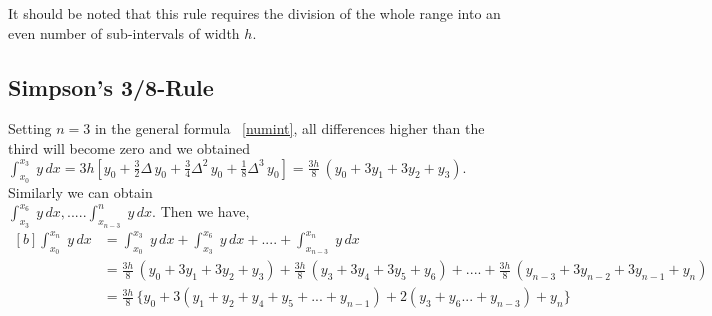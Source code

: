 \documentclass[aima203_lecturenotes_ku.tex]{subfiles}
\begin{document}
\begin{remark}
  It should be noted that this rule requires the division of the whole range into an even number of sub-intervals of width $h$.
\end{remark}

\subsection{Simpson's 3/8-Rule}
Setting $n=3$ in the general formula ~\ref{numint}, all differences higher than the third will become zero and we obtained \\[1mm]
$\displaystyle \int_{x_0}^{x_3} \; y\,dx = 3h \left [ y_0 + \frac{3}{2} \Delta \, y_0 + \frac{3}{4} \Delta^2 \, y_0 + \frac{1}{8} \Delta ^3 \, y_0 \right ] = \frac{3h}{8}\, (y_0 + 3y_1 + 3y_2+y_3).$ \\ Similarly we can obtain \\[5mm] $\int_{x_3}^{x_6} \; y\,dx, ..... \int_{x_{n-3}}^n \; y\,dx $. Then we have,
\begin{equation}
  \label{simp2}
  \begin{aligned}[b]
    \int_{x_0}^{x_n}\; y\,dx &= \int_{x_0}^{x_3} \; y\,dx + \int_{x_3}^{x_6} \; y\,dx + .... + \int_{x_{n-3}}^{x_n} \; y\,dx \\[1mm]
                             &= \frac{3h}{8} \, (y_0 +3y_1 + 3y_2 + y_3) + \frac{3h}{8} \, (y_3 + 3y_4 + 3y_5 + y_6) + .... + \frac{3h}{8} \, (y_{n-3} + 3y_{n-2} + 3y_{n-1} + y_n) \\[1mm]
                             &= \frac{3h}{8} \, \{ y_0 + 3(y_1 + y_2 + y_4 + y_5 + ... + y_{n-1}) + 2 (y_3 + y_6  ... + y_{n-3} ) + y_n \}
  \end{aligned}
\end{equation}
\end{document}
